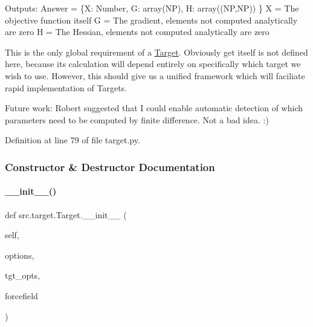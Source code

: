 Outputs\+: Answer = \{\textquotesingle{}X\textquotesingle{}\+: Number, \textquotesingle{}G\textquotesingle{}\+: array(\+N\+P), \textquotesingle{}H\textquotesingle{}\+: array((\+N\+P,\+N\+P)) \} \textquotesingle{}X\textquotesingle{} = The objective function itself \textquotesingle{}G\textquotesingle{} = The gradient, elements not computed analytically are zero \textquotesingle{}H\textquotesingle{} = The Hessian, elements not computed analytically are zero

This is the only global requirement of a \hyperlink{classsrc_1_1target_1_1Target}{Target}. Obviously \textquotesingle{}get\textquotesingle{} itself is not defined here, because its calculation will depend entirely on specifically which target we wish to use. However, this should give us a unified framework which will faciliate rapid implementation of Targets.

Future work\+: Robert suggested that I could enable automatic detection of which parameters need to be computed by finite difference. Not a bad idea. \+:) 

Definition at line 79 of file target.\+py.



\subsubsection{Constructor \& Destructor Documentation}
\mbox{\label{classsrc_1_1target_1_1Target_ad813da97ae8fc89665a12c35145cdde6}} 
\paragraph{\texorpdfstring{\+\_\+\+\_\+init\+\_\+\+\_\+()}{\_\_init\_\_()}}
{\footnotesize\ttfamily def src.\+target.\+Target.\+\_\+\+\_\+init\+\_\+\+\_\+ (\begin{DoxyParamCaption}\item[{}]{self,  }\item[{}]{options,  }\item[{}]{tgt\+\_\+opts,  }\item[{}]{forcefield }\end{DoxyParamCaption})}



